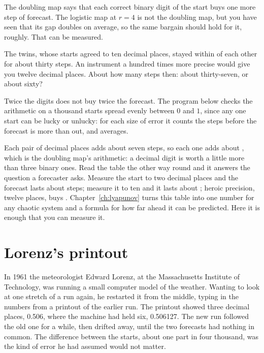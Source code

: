\noindent
The doubling map says that each correct binary digit of the start buys one
more step of forecast. The logistic map at $r = 4$ is not the doubling map,
but you have seen that its gap doubles on average, so the same bargain
should hold for it, roughly. That can be measured.

\begin{think}
The twins, whose starts agreed to ten decimal places, stayed within
 of each other for about thirty steps. An instrument a hundred
times more precise would give you twelve decimal places. About how many
steps then: about thirty-seven, or about sixty?
\end{think}
Twice the digits does not buy twice the forecast. The program below checks
the arithmetic on a thousand starts spread evenly between $0$ and $1$, since
any one start can be lucky or unlucky: for each size of error it counts the
steps before the forecast is more than  out, and averages.



\noindent
Each pair of decimal places adds about seven steps, so each one adds about
, which is the doubling map's arithmetic: a decimal digit
is worth a little more than three binary ones. Read the table the other way
round and it answers the question a forecaster asks. Measure the start to
two decimal places and the forecast lasts about  steps;
measure it to ten and it lasts about ; heroic precision,
twelve places, buys . Chapter~\ref{ch:lyapunov} turns
this table into one number for any chaotic system and a formula for how far
ahead it can be predicted. Here it is enough that you can measure it.

\section{Lorenz's printout}
\label{sec:ch06-lorenz}

\noindent
In 1961 the meteorologist Edward Lorenz, at the Massachusetts Institute of
Technology, was running a small computer model of the weather. Wanting to
look at one stretch of a run again, he restarted it from the middle, typing
in the numbers from a printout of the earlier run. The printout showed three
decimal places, \num{0.506}, where the machine had held six,
\num{0.506127}. The new run followed the old one for a while, then drifted
away, until the two forecasts had nothing in common. The difference between
the starts, about one part in four thousand, was the kind of error he had
assumed would not matter.

